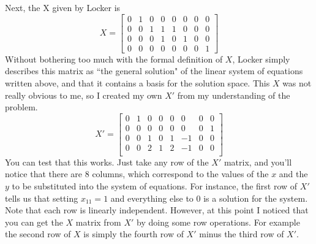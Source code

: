 \documentclass[11pt,reqno,oneside,a4paper]{article}
\begin{document}
   Next, the X given by Locker is 
   $$ X=\begin{bmatrix} 
   0 & 1 & 0 & 0 & 0 & 0 & 0 & 0 \\
   0 & 0 & 1 & 1 & 1 & 0 & 0 & 0 \\
   0 & 0 & 0 & 1 & 0 & 1 & 0 & 0 \\
   0 & 0 & 0 & 0 & 0 & 0 & 0 & 1 
   \end{bmatrix} $$
   Without bothering too much with the formal definition of $X$, Locker simply describes this matrix as ``the general solution" of the linear system of equations written above, and that it contains a basis for the solution space. This $X$ was not really obvious to me, so I created my own $X'$ from my understanding of the problem.
   $$ X'=\begin{bmatrix} 
   0 & 1 & 0 & 0 & 0 & 0 & 0 & 0 \\
   0 & 0 & 0 & 0 & 0 & 0 & 0 & 1 \\
   0 & 0 & 1 & 0 & 1 & -1 & 0 & 0 \\
   0 & 0 & 2 & 1 & 2 & -1 & 0 & 0 \\
   \end{bmatrix} $$
   You can test that this works. Just take any row of the $X'$ matrix, and you'll notice that there are 8 columns, which correspond to the values of the $x$ and the $y$ to be substituted into the system of equations. For instance, the first row of $X'$ tells us that setting $x_{11} = 1$ and everything else to 0 is a solution for the system. Note that each row is linearly independent. However, at this point I noticed that you can get the $X$ matrix from $X'$ by doing some row operations. For example the second row of $X$ is simply the fourth row of $X'$ minus the third row of $X'$. 
   
\end{document}
